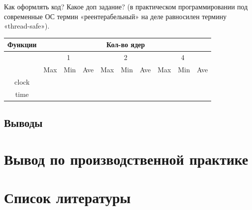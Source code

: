 \documentclass{article}
\begin{document}
		Как оформлять код?
		Какое доп задание?
		 (в практическом программировании под современные ОС термин «реентерабельный» на деле равносилен термину «thread-safe»).		
		
		\begin{table}
			\begin{tabular}{|c|c|c|c|c|c|c|c|c|c|} 
			\hline
			Функции	& \multicolumn{9}{|c|}{ Кол-во ядер }\\
			\hline
			\qquad 	& \multicolumn{3}{|c|}{ 1 } & \multicolumn{3}{|c|}{ 2 } & \multicolumn{3}{|c|}{ 4 } \\
			\hline
			\qquad	&	Max	&	Min	&	Ave	&	Max	&	Min	&	Ave	&	Max	&	Min	&	Ave	 \\
			\hline			
			clock	\\
			time	\\
			\end{tabular}		
		\end{table}
		
		\subsection{Выводы}
	\newpage
	\section{Вывод по производственной практике}
	\newpage
	\section{Список литературы}
\end{document}
